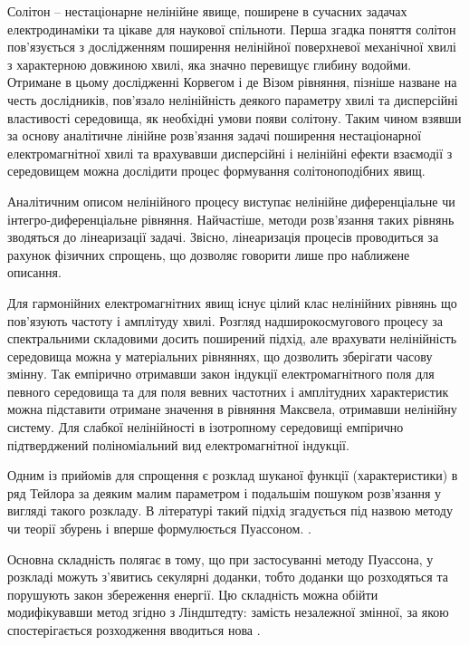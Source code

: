 Солітон -- нестаціонарне нелінійне явище, поширене в сучасних 
задачах електродинаміки та цікаве для наукової спільноти. Перша згадка 
поняття солітон пов'язується з дослідженням поширення нелінійної поверхневої 
механічної хвилі з характерною довжиною хвилі, яка значно перевищує глибину 
водойми. Отримане в цьому дослідженні Корвегом і де Візом рівняння, пізніше 
назване на честь дослідників, пов'язало нелінійність деякого параметру хвилі 
та дисперсійні властивості середовища, як необхідні умови появи солітону.
Таким чином взявши за основу аналітичне лінійне розв'язання задачі поширення 
нестаціонарної електромагнітної хвилі та врахувавши дисперсійні і нелінійні 
ефекти взаємодії з середовищем можна дослідити процес формування 
солітоноподібних явищ.

Аналітичним описом нелінійного процесу виступає нелінійне диференціальне чи 
інтегро-диференціальне рівняння. Найчастіше, методи розв'язання таких рівнянь
зводяться до лінеаризації задачі. Звісно, лінеаризація процесів проводиться за
рахунок фізичних спрощень, що дозволяє говорити лише про наближене описання.

Для гармонійних електромагнітних явищ існує цілий клас нелінійних рівнянь що пов'язують частоту і амплітуду хвилі. Розгляд надширокосмугового процесу
за спектральними складовими досить поширений підхід, але врахувати нелінійність 
середовища можна у матеріальних рівняннях, що дозволить зберігати часову змінну.
Так емпірично отримавши закон індукції електромагнітного поля для певного середовища та для поля вевних частотних і амплітудних характеристик можна 
підставити отримане значення в рівняння Максвела, отримавши нелінійну систему.
Для слабкої нелінійності в ізотропному середовищі емпірично підтверджений поліноміальний вид електромагнітної індукції.

Одним із прийомів для спрощення є розклад шуканої функції (характеристики) в 
ряд Тейлора за деяким малим параметром і подальшім пошуком розв'язання у 
вигляді такого розкладу. В літературі такий підхід згадується під назвою 
методу чи теорії збурень і вперше формулюється Пуассоном.
\cite{imp:NonlinearWaves1983}.

Основна складність полягає в тому, що при застосуванні методу Пуассона, у 
розкладі можуть з'явитись секулярні доданки, тобто доданки що розходяться та 
порушують закон збереження енергії. Цю складність можна обійти модифікувавши 
метод згідно з Ліндштедту: замість незалежної змінної, за якою 
спостерігається розходження вводиться нова \cite{imp:Wien1931}.

